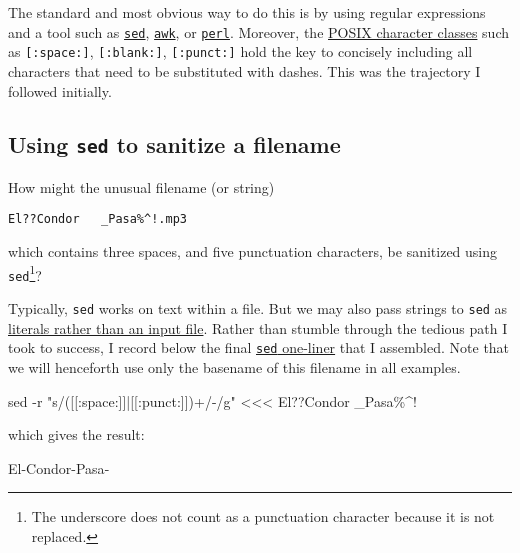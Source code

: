 \documentclass[
  a4paper,
]{article}
\newenvironment{Shaded}{\begin{snugshade}}{\end{snugshade}}
\newcommand{\AttributeTok}[1]{\textcolor[rgb]{0.80,0.80,0.80}{#1}}
\newcommand{\FunctionTok}[1]{\textcolor[rgb]{0.94,0.94,0.56}{#1}}
\newcommand{\NormalTok}[1]{\textcolor[rgb]{0.80,0.80,0.80}{#1}}
\newcommand{\OperatorTok}[1]{\textcolor[rgb]{0.94,0.94,0.82}{#1}}
\newcommand{\StringTok}[1]{\textcolor[rgb]{0.80,0.58,0.58}{#1}}
\begin{document}
The standard and most obvious way to do this is by using regular
expressions and a tool such as
\href{https://www.grymoire.com/Unix/Sed.html}{\texttt{sed}},
\href{https://tldp.org/LDP/abs/html/awk.html}{\texttt{awk}}, or
\href{https://perldoc.perl.org/perlretut}{\texttt{perl}}. Moreover, the
\href{https://www.regular-expressions.info/posixbrackets.html}{POSIX
character classes} such as \texttt{{[}:space:{]}},
\texttt{{[}:blank:{]}}, \texttt{{[}:punct:{]}} hold the key to concisely
including all characters that need to be substituted with dashes. This
was the trajectory I followed initially.

\hypertarget{using-sed-to-sanitize-a-filename}{%
\subsection{\texorpdfstring{Using \texttt{sed} to sanitize a
filename}{Using sed to sanitize a filename}}\label{using-sed-to-sanitize-a-filename}}

How might the unusual filename (or string)

\texttt{El??Condor\ \ \ \_Pasa\%\^{}!.mp3}

which contains three spaces, and five punctuation characters, be
sanitized using \texttt{sed}\footnote{The underscore does not count as a
  punctuation character because it is not replaced.}?

Typically, \texttt{sed} works on text within a file. But we may also
pass strings to \texttt{sed} as
\href{https://www.baeldung.com/linux/sed-with-string}{literals rather
than an input file}. Rather than stumble through the tedious path I took
to success, I record below the final
\href{https://catonmat.net/sed-one-liners-explained-part-one}{\texttt{sed}
one-liner} that I assembled. Note that we will henceforth use only the
basename of this filename in all examples.

\begin{Shaded}
\begin{Highlighting}[]
\FunctionTok{sed} \AttributeTok{{-}r} \StringTok{"s/([[:space:]]|[[:punct:]])+/{-}/g"} \OperatorTok{\textless{}\textless{}\textless{}} \StringTok{\textquotesingle{}El??Condor   \_Pasa\%\^{}!\textquotesingle{}}
\end{Highlighting}
\end{Shaded}

which gives the result:

\begin{Shaded}
\begin{Highlighting}[]
\NormalTok{El{-}Condor{-}Pasa{-}}
\end{Highlighting}
\end{Shaded}
\end{document}
